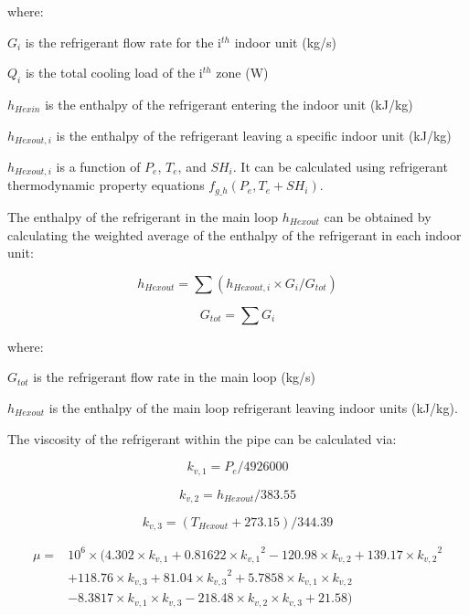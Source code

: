 where:

$G_i$ is the refrigerant flow rate for the i\(^{th}\) indoor unit (kg/s) 

$Q_i$ is the total cooling load of the i\(^{th}\) zone (W) 

$h_{Hexin}$ is the enthalpy of the refrigerant entering the indoor unit (kJ/kg)

$h_{Hexout,i}$ is the enthalpy of the refrigerant leaving a specific indoor unit (kJ/kg)

$h_{Hexout,i}$ is a function of $P_e$, $T_e$, and $SH_i$. It can be calculated using refrigerant thermodynamic property equations $f_{g\_h}(P_e,T_e+SH_i)$.

The enthalpy of the refrigerant in the main loop $h_{Hexout}$ can be obtained by calculating the weighted average of the enthalpy of the refrigerant in each indoor unit:

\begin{equation}
  h_{Hexout}=\sum(h_{Hexout,i}\times{G_i}/{G_{tot}})
\end{equation}

\begin{equation}
  G_{tot}=\sum{G_i}
\end{equation}

where:

$G_{tot}$ is the refrigerant flow rate in the main loop (kg/s) 

$h_{Hexout}$ is the enthalpy of the main loop refrigerant leaving indoor units (kJ/kg).

The viscosity of the refrigerant within the pipe can be calculated via:

\begin{equation}
  k_{v,1}=P_e/4926000
\end{equation}

\begin{equation}
  k_{v,2}=h_{Hexout}/383.55
\end{equation}

\begin{equation}
  k_{v,3}=(T_{Hexout}+273.15)/344.39
\end{equation}

\begin{equation}
\begin{array}{rl}
\mu =& 10^6\times(4.302\times{k_{v,1}}+0.81622\times{k_{v,1}}^2-120.98\times{k_{v,2}}+139.17\times{k_{v,2}}^2 \\
 & +118.76\times{k_{v,3}}+81.04\times{k_{v,3}}^2+5.7858\times{k_{v,1}}\times{k_{v,2}} \\
 & -8.3817\times{k_{v,1}}\times{k_{v,3}}-218.48\times{k_{v,2}}\times{k_{v,3}}+21.58)
\end{array}
\end{equation}

